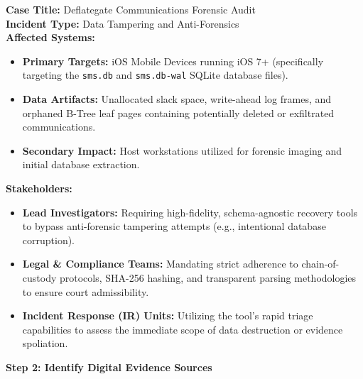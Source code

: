 \documentclass[11pt, a4paper]{article}
\begin{document}
\noindent
\textbf{Case Title:} Deflategate Communications Forensic Audit \\
\textbf{Incident Type:} Data Tampering and Anti-Forensics \\

\vspace{0.3cm}
\noindent\textbf{Affected Systems:}
\begin{itemize}
    \setlength\itemsep{0em}
    \item \textbf{Primary Targets:} iOS Mobile Devices running iOS 7+ (specifically targeting the \texttt{sms.db} and \texttt{sms.db-wal} SQLite database files).
    \item \textbf{Data Artifacts:} Unallocated slack space, write-ahead log frames, and orphaned B-Tree leaf pages containing potentially deleted or exfiltrated communications.
    \item \textbf{Secondary Impact:} Host workstations utilized for forensic imaging and initial database extraction.
\end{itemize}

\vspace{0.3cm}
\noindent\textbf{Stakeholders:}
\begin{itemize}
    \setlength\itemsep{0em}
    \item \textbf{Lead Investigators:} Requiring high-fidelity, schema-agnostic recovery tools to bypass anti-forensic tampering attempts (e.g., intentional database corruption).
    \item \textbf{Legal \& Compliance Teams:} Mandating strict adherence to chain-of-custody protocols, SHA-256 hashing, and transparent parsing methodologies to ensure court admissibility.
    \item \textbf{Incident Response (IR) Units:} Utilizing the tool's rapid triage capabilities to assess the immediate scope of data destruction or evidence spoliation.
\end{itemize}


\vspace{0.6cm}
\noindent\textcolor{sectionblue}{\Large\textbf{Step 2: Identify Digital Evidence Sources}}
\end{document}

